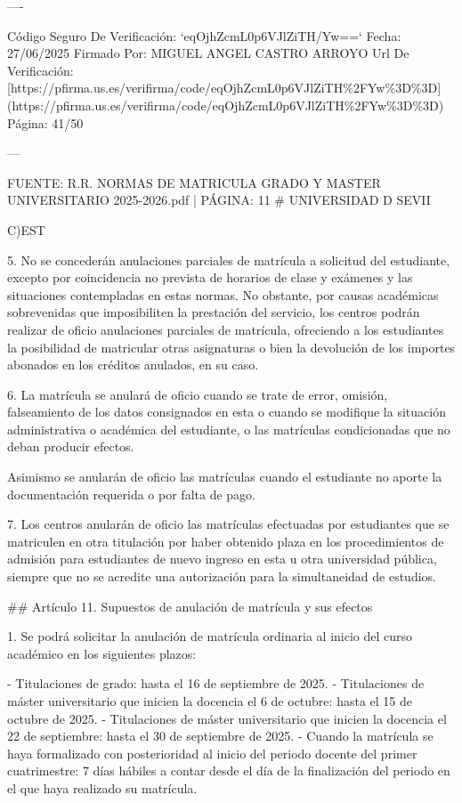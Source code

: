 \documentclass{article}
\begin{document}
\begin{itemize}
\begin{itemize}
\begin{scriptsize}
                  ----

                  Código Seguro De Verificación: `eqOjhZcmL0p6VJlZiTH/Yw==`
                  Fecha: 27/06/2025
                  Firmado Por: MIGUEL ANGEL CASTRO ARROYO
                  Url De Verificación: [https://pfirma.us.es/verifirma/code/eqOjhZcmL0p6VJlZiTH\%2FYw\%3D\%3D](https://pfirma.us.es/verifirma/code/eqOjhZcmL0p6VJlZiTH\%2FYw\%3D\%3D)
                  Página: 41/50

                  ---

                  FUENTE: R.R. NORMAS DE MATRICULA GRADO Y MASTER UNIVERSITARIO 2025-2026.pdf | PÁGINA: 11
                  \# UNIVERSIDAD D SEVII

                  C)EST

                  5. No se concederán anulaciones parciales de matrícula a solicitud del estudiante, excepto por coincidencia no prevista de horarios de clase y exámenes y las situaciones contempladas en estas normas. No obstante, por causas académicas sobrevenidas que imposibiliten la prestación del servicio, los centros podrán realizar de oficio anulaciones parciales de matrícula, ofreciendo a los estudiantes la posibilidad de matricular otras asignaturas o bien la devolución de los importes abonados en los créditos anulados, en su caso.

                  6. La matrícula se anulará de oficio cuando se trate de error, omisión, falseamiento de los datos consignados en esta o cuando se modifique la situación administrativa o académica del estudiante, o las matrículas condicionadas que no deban producir efectos.

                  Asimismo se anularán de oficio las matrículas cuando el estudiante no aporte la documentación requerida o por falta de pago.

                  7. Los centros anularán de oficio las matrículas efectuadas por estudiantes que se matriculen en otra titulación por haber obtenido plaza en los procedimientos de admisión para estudiantes de nuevo ingreso en esta u otra universidad pública, siempre que no se acredite una autorización para la simultaneidad de estudios.

                  \#\# Artículo 11. Supuestos de anulación de matrícula y sus efectos

                  1. Se podrá solicitar la anulación de matrícula ordinaria al inicio del curso académico en los siguientes plazos:

                  - Titulaciones de grado: hasta el 16 de septiembre de 2025.
                  - Titulaciones de máster universitario que inicien la docencia el 6 de octubre: hasta el 15 de octubre de 2025.
                  - Titulaciones de máster universitario que inicien la docencia el 22 de septiembre: hasta el 30 de septiembre de 2025.
                  - Cuando la matrícula se haya formalizado con posterioridad al inicio del periodo docente del primer cuatrimestre: 7 días hábiles a contar desde el día de la finalización del periodo en el que haya realizado su matrícula.


\end{scriptsize}
\end{itemize}
\end{itemize}
\end{document}
